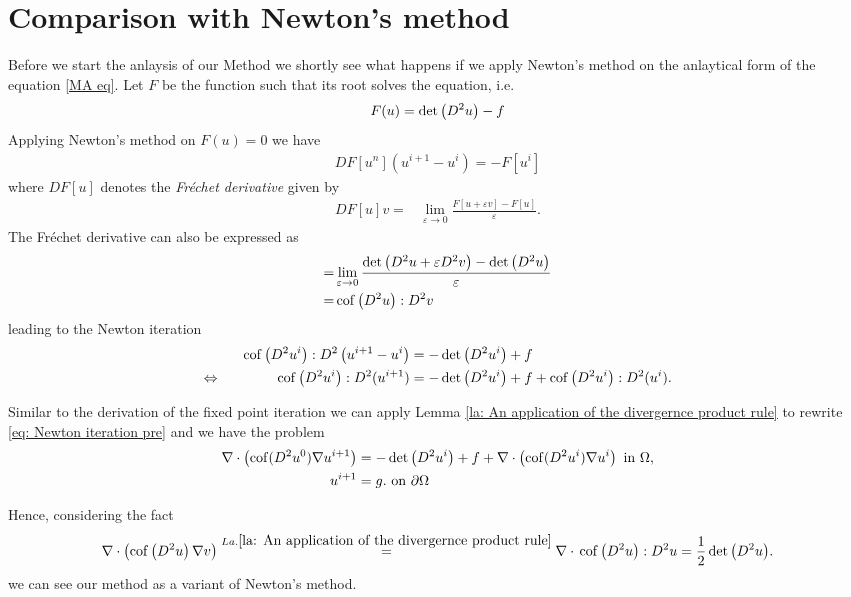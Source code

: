 \section{Comparison with Newton's method}

Before we start the anlaysis of our Method we shortly see what happens if we apply Newton's method on the anlaytical form of the \MA equation \ref{MA eq}.
Let $F$ be the function such that its root solves the \MA equation, i.e. 
\[
	F(u) = \det{\left(D^2 u\right)} -f
\]
Applying Newton's method on $F(u) =0$ we have
\begin{align}
	DF[u^n](u^{i+1}-u^i) = -F[u^i]
\end{align}
where $DF[u]$ denotes the \emph{Fr\'echet derivative} given by
\begin{align*}
	DF[u] v =& \lim\limits_{\varepsilon \rightarrow 0} \frac { F[u+\varepsilon v]- F[u]} \varepsilon.
\end{align*}
The Fr\'echet derivative can also be expressed as
\begin{align*}
				 =& \lim\limits_{\varepsilon \rightarrow 0} \frac { \det{\left(D^2u+\varepsilon D^2v\right)} - \det{\left(D^2u\right)}}\varepsilon\\ 
				 =& \operatorname{cof} \left( D^2 u \right):D^2v
\end{align*}
leading to the Newton iteration
\begin{align}
	\operatorname{cof} \left( D^2 u^i \right):D^2\left(u^{i+1}-u^i\right) &= -\det{\left(D^2 u^i\right)}+f \nonumber \\
	\Leftrightarrow \qquad \qquad  \operatorname{cof} \left( D^2 u^i \right):D^2(u^{i+1}) &= -\det{\left(D^2 u^i\right)} +f  +\operatorname{cof} \left( D^2 u^i \right):D^2(u^i). \label{eq: Newton iteration pre}
\end{align}

Similar to the derivation of the fixed point iteration we can apply Lemma \ref{la: An application of the divergernce product rule} to rewrite \eqref{eq: Newton iteration pre} and we have the problem
\begin{align}
	\nabla \cdot \left( \operatorname{cof}(D^2 u^0) \nabla u^{i+1} \right) &= -\det{\left(D^2u^i\right)} +f+\nabla \cdot \left( \operatorname{cof}(D^2 u^i) \nabla u^{i} \right)  \textnormal{ in } \Omega,  \label{eq: Newton iteration}\\
	u^{i+1} &= g. \textnormal{ on } \partial \Omega 
\end{align}

Hence, considering  the fact 
\[
\nabla \cdot \left( \operatorname{cof} \left( D^2 u  \right) \nabla v \right)
\stackrel{La.\ref{la: An application of the divergernce product rule}}=\nabla \cdot {}\operatorname{cof} \left( D^2 u \right):D^2u
=\frac 1 2 \det{\left(D^2u\right)}.
\]
we can see our method as a variant of Newton's method. 

